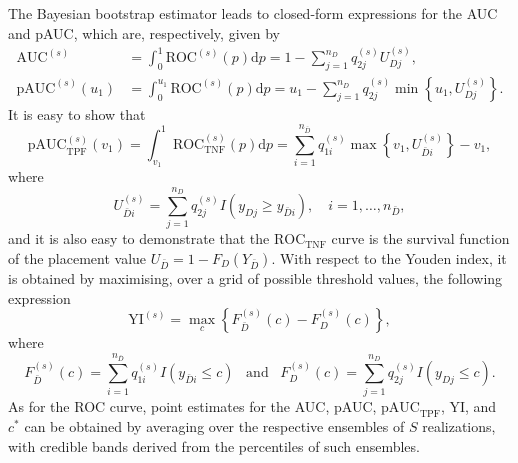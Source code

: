 The Bayesian bootstrap estimator leads to closed-form expressions for the AUC and pAUC, which are, respectively, given by
\begin{align*}
\text{AUC}^{(s)} &= \int_0^1\text{ROC}^{(s)}(p)\text{d}p = 1-\sum_{j=1}^{n_D}q_{2j}^{(s)}U_{Dj}^{(s)},\\
\text{pAUC}^{(s)}(u_1)&=\int_{0}^{u_1}\text{ROC}^{(s)}(p)\text{d}p = u_1-\sum_{j=1}^{n_D}q_{2j}^{(s)}\min\left\{u_1,U_{Dj}^{(s)}\right\}.
\end{align*}
It is easy to show that
\[
\text{pAUC}^{(s)}_{\text{TPF}}(v_1) = \int_{v_1}^{1}\text{ROC}^{(s)}_{\text{TNF}}\left(p\right)\text{d}p = \sum_{i=1}^{n_{\bar{D}}}q_{1i}^{(s)}\max\left\{v_1,U_{\bar{D}i}^{(s)}\right\} - v_1,
\]
where
\begin{equation*}
U_{\bar{D}i}^{(s)}=\sum_{j=1}^{n_D}q_{2j}^{(s)}I\left(y_{Dj}\geq y_{\bar{D}i}\right), \quad i=1,\ldots,n_{\bar{D}},
\end{equation*}
and it is also easy to demonstrate that the $\text{ROC}_{\text{TNF}}$ curve is the survival function of the placement value $U_{\bar{D}}=1-F_{D}(Y_{\bar{D}})$. With respect to the Youden index, it is obtained by maximising, over a grid of possible threshold values, the following expression
\[
\text{YI}^{(s)} = \max_{c}\left\{F^{(s)}_{\bar{D}}\left(c\right) - F^{(s)}_{D}\left(c\right)\right\},
\]
where
\[
F^{(s)}_{\bar{D}}\left(c\right) = \sum_{i=1}^{n_{\bar{D}}}q_{1i}^{(s)}I\left(y_{\bar{D}i} \leq c\right) \;\;\; \mbox{and} \;\;\; F^{(s)}_{D}\left(c\right) = \sum_{j=1}^{n_{D}}q_{2j}^{(s)}I\left(y_{Dj} \leq c\right).
\]
As for the ROC curve, point estimates for the AUC, pAUC, $\text{pAUC}_{\text{TPF}}$, YI, and $c^{*}$ can be obtained by averaging over the respective ensembles of $S$ realizations, with credible bands derived from the percentiles of such ensembles.

